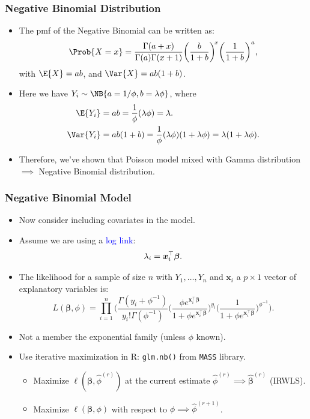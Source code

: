 \documentclass[oneside]{book}\usepackage[]{graphicx}\usepackage[svgnames]{xcolor}
\let\log\relax%
\providecommand{\Vector}[1]{\bm{#1}}%
\begin{document}
\subsubsection*{Negative Binomial Distribution}
\begin{itemize}
    \item The pmf of the Negative Binomial can be written as:
          \[ \Prob{X=x}=\frac{\Gamma(a+x)}{\Gamma(a)\Gamma(x+1)}\biggl(\frac{b}{1+b}\biggr)^{\!x}\biggl(\frac{1}{1+b}\biggr)^{a}, \]
          with $ \E{X}=ab $, and $ \Var{X}=ab(1+b) $.
    \item Here we have $ Y_i \sim \NB{a=1/\phi,b=\lambda\phi} $, where
          \begin{align*}
              \E{Y_i}   & =ab=\frac{1}{\phi}(\lambda\phi)=\lambda.                                    \\
              \Var{Y_i} & =ab(1+b)=\frac{1}{\phi}(\lambda\phi)(1+\lambda\phi)=\lambda(1+\lambda\phi).
          \end{align*}
    \item Therefore, we've shown that Poisson model mixed with Gamma distribution $ \implies $ Negative Binomial distribution.
\end{itemize}
\subsubsection*{Negative Binomial Model}
\begin{itemize}
    \item Now consider including covariates in the model.
    \item Assume we are using a \textcolor{Blue}{log link}:
          \[ \log{\lambda_i}=\Vector{x}_i^\top \Vector{\beta}. \]
    \item The likelihood for a sample of size $ n $ with $ Y_1,\ldots,Y_n $ and $ \Vector{x}_i $ a $ p\times 1 $ vector of explanatory
          variables is:
          \[ L(\Vector{\beta},\phi)=\prod_{i=1}^n
              \biggl(\frac{\Gamma(y_i+\phi^{-1})}{y_i!\Gamma(\phi^{-1})}
              \biggl(\frac{\phi e^{\Vector{x}_i^\top \Vector{\beta}}}{1+\phi e^{\Vector{x}_i^\top \Vector{\beta}}}\biggr)^{\!y_i}
              \biggl(\frac{1}{1+\phi e^{\Vector{x}_i^\top \Vector{\beta}}}\biggr)^{\!\phi^{-1}}
              \biggr). \]
    \item Not a member the exponential family (unless $ \phi $ known).
    \item Use iterative maximization in R: \texttt{glm.nb()} from \texttt{MASS} library.
          \begin{itemize}
              \item Maximize $ \ell(\Vector{\beta},\hat{\phi}^{(r)}) $ at the current estimate $ \hat{\phi}^{(r)}\implies \hat{\Vector{\beta}}^{(r)} $ (IRWLS).
              \item Maximize $ \ell(\Vector{\beta},\phi) $ with respect to $ \phi\implies \hat{\phi}^{(r+1)} $.
          \end{itemize}
\end{itemize}
\end{document}

